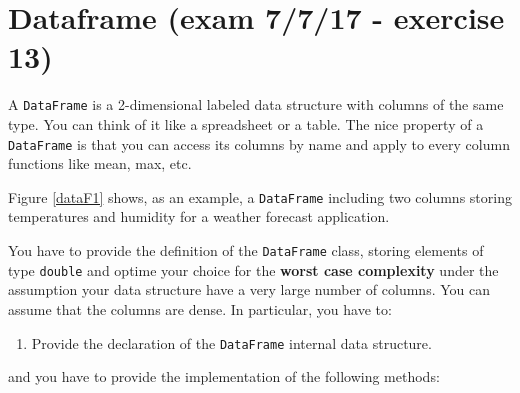
\chapter*{Dataframe (exam 7/7/17 - exercise 13)}
\thispagestyle{empty}

A \texttt{DataFrame} is a 2-dimensional labeled data structure with columns of the same type. You
can think of it like a spreadsheet or a table. The nice property of a \texttt{DataFrame} is that you
can access its columns by name and apply to every column functions like mean, max, etc. 

Figure \ref{dataF1} shows, as an example, a \texttt{DataFrame} including two columns storing temperatures and humidity for a weather forecast application.

You have to provide the definition of the \texttt{DataFrame} class, storing elements of type \texttt{double} and optime your choice for the \textbf{worst case complexity} under the assumption your data structure have a very large number of columns. You can assume that the columns are dense. In particular, you have to:
\begin{enumerate}
\item Provide the declaration of the \texttt{DataFrame} internal data structure.
\end{enumerate}

and you have to provide the implementation of the following methods:

